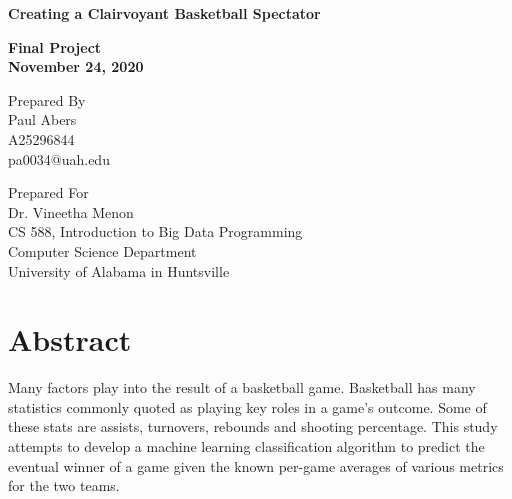 \documentclass[12pt]{article}%
\begin{document}
\begin{titlepage}
	\clearpage\thispagestyle{empty}
	\centering
	\vspace{2cm}

	{\Huge \textbf{Creating a Clairvoyant Basketball Spectator}} \\
	\vspace{1cm}
	{\large \textbf{Final Project \\
      November 24, 2020} \par}
	\vspace{4cm}
	{\normalsize Prepared By \\ %
      Paul Abers \\
      A25296844 \\
      pa0034@uah.edu \par}
	\vspace{2cm}

    \vspace{2cm}

 	{\normalsize Prepared For \\
		Dr. Vineetha Menon \\
		CS 588, Introduction to Big Data Programming \\
        Computer Science Department \\
        University of Alabama in Huntsville \par}

      \vspace{2cm}

	\pagebreak

\end{titlepage}

\tableofcontents

\section{Abstract}
Many factors play into the result of a basketball game. Basketball has many statistics commonly quoted as playing key roles in a game's outcome. Some of these stats are assists, turnovers, rebounds and shooting percentage. This study attempts to develop a machine learning classification algorithm to predict the eventual winner of a game given the known per-game averages of various metrics for the two teams.
\end{document}
